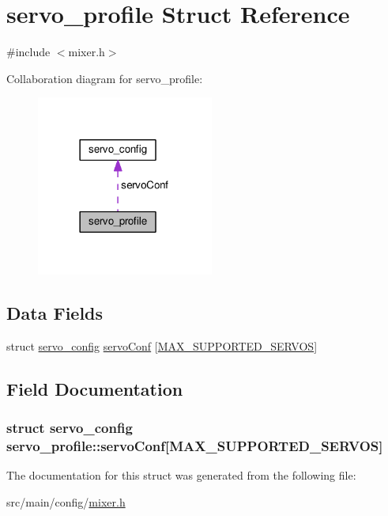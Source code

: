 \hypertarget{structservo__profile}{\section{servo\+\_\+profile Struct Reference}
\label{structservo__profile}
}


{\ttfamily \#include $<$mixer.\+h$>$}



Collaboration diagram for servo\+\_\+profile\+:\nopagebreak
\begin{figure}[H]
\begin{center}
\leavevmode
\includegraphics[width=165pt]{structservo__profile__coll__graph}
\end{center}
\end{figure}
\subsection*{Data Fields}
\begin{DoxyCompactItemize}
\item 
struct \hyperlink{structservo__config}{servo\+\_\+config} \hyperlink{structservo__profile_ad32066fc950b62130236a8aef635cc99}{servo\+Conf} \mbox{[}\hyperlink{config_2mixer_8h_ada6fb418c359e00906599a7f6ac6c92d}{M\+A\+X\+\_\+\+S\+U\+P\+P\+O\+R\+T\+E\+D\+\_\+\+S\+E\+R\+V\+O\+S}\mbox{]}
\end{DoxyCompactItemize}


\subsection{Field Documentation}
\hypertarget{structservo__profile_ad32066fc950b62130236a8aef635cc99}{
\subsubsection[{servo\+Conf}]{\setlength{\rightskip}{0pt plus 5cm}struct {\bf servo\+\_\+config} servo\+\_\+profile\+::servo\+Conf\mbox{[}{\bf M\+A\+X\+\_\+\+S\+U\+P\+P\+O\+R\+T\+E\+D\+\_\+\+S\+E\+R\+V\+O\+S}\mbox{]}}}\label{structservo__profile_ad32066fc950b62130236a8aef635cc99}


The documentation for this struct was generated from the following file\+:\begin{DoxyCompactItemize}
\item 
src/main/config/\hyperlink{config_2mixer_8h}{mixer.\+h}\end{DoxyCompactItemize}
